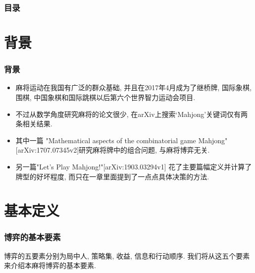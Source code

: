 \documentclass[xcolor=dvipsnames]{ctexbeamer}
\title{\TITLE}
\author{\AUTHOR}
\date{\today}
\institute{\INSTITUTE}
\begin{document}

    \begin{frame}
        \titlepage
    \end{frame}
    
    
    \begin{frame}
        \frametitle{目录}
        \tableofcontents
    \end{frame}

    
    \section{背景}

    \begin{frame}
        \frametitle{背景}
        \begin{itemize}
            \item 麻将运动在我国有广泛的群众基础, 并且在2017年4月成为了继桥牌,
                国际象棋, 围棋, 中国象棋和国际跳棋以后第六个世界智力运动会项目.
            \item 不过从数学角度研究麻将的论文很少,
                在arXiv上搜索`Mahjong'关键词仅有两条相关结果.
            \item 其中一篇
                "Mathematical aspects of the combinatorial game Mahjong"
                [arXiv:1707.07345v2]研究麻将牌中的组合问题,
                与麻将博弈无关.
            \item 另一篇"Let's Play Mahjong!"[arXiv:1903.03294v1]
                花了主要篇幅定义并计算了牌型的好坏程度,
                而只在一章里面提到了一点点具体决策的方法.
        \end{itemize}
    \end{frame}

    \section{基本定义}

    \begin{frame}
        \frametitle{博弈的基本要素}
        博弈的五要素分别为局中人, 策略集, 收益, 信息和行动顺序.
        我们将从这五个要素来介绍本麻将博弈的基本要素.
    \end{frame}
\end{document}
